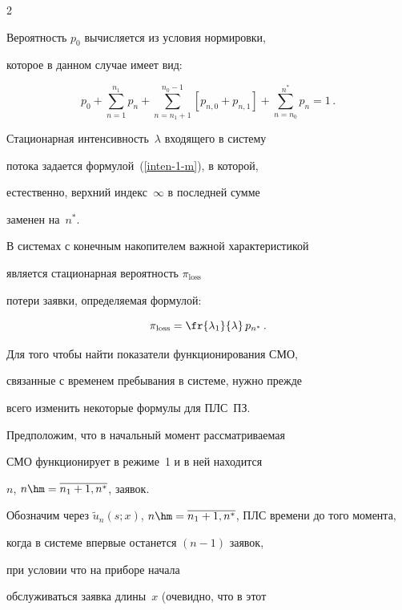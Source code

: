 \begin{multicols}{2}


Вероятность $p_0$ вычисляется из условия нормировки,


которое в данном случае имеет вид:


$$


p_0 + \sum\limits_{n=1}^{n_1} p_n + \sum\limits_{n=n_1+1}^{n_0-1} \left[p_{n,0} + p_{n,1}\right]+


\sum\limits_{n=n_0}^{n^*} p_n = 1\,.


$$





Стационарная интенсивность~$\lambda$ входящего в сис\-те\-му


потока задается формулой~(\ref{inten-1-m}), в которой,


естественно, верхний индекс~$\infty$ в последней сумме


заменен на~$n^*$.





В системах с конечным накопителем важной характеристикой


является стационарная вероятность $\pi_{\mathrm{loss}}$


потери заявки, определяемая формулой:


$$


\pi_{\mathrm{loss}} = \fr{\lambda_1 }{\lambda}\, p_{n^*}\,.


$$





Для того чтобы найти показатели функционирования СМО,


связанные с временем пребывания в системе, нужно прежде


всего изменить некоторые формулы для ПЛС~ПЗ.





Предположим, что в начальный момент рас\-смат\-ри\-ва\-емая


СМО функционирует в режиме~1 и в ней находится


$n$, $n\hm=\overline{n_1+1,n^*}$, заявок.


Обозначим через $\tilde{u}_n(s;x)$, $n\hm=\overline{n_1+1,n^*}$, ПЛС времени до того момента,


когда в системе впервые останется $(n-1)$ заявок,


при условии что на приборе начала


обслуживаться заявка длины~$x$ (очевидно, что в этот



\end{multicols}
